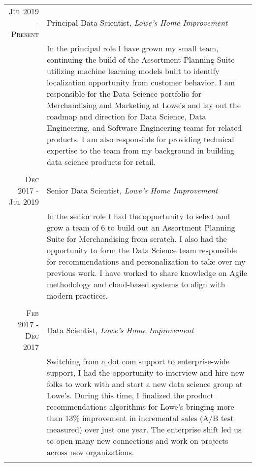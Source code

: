 \documentclass[a4paper,10pt]{article} %
\begin{document}
\begin{tabular}{r|p{11cm}}

\textsc{Jul 2019 - Present} & Principal Data Scientist, \emph{Lowe's Home Improvement} \\
& \footnotesize{In the principal role I have grown my small team, continuing the build of the Assortment Planning Suite utilizing machine learning models built to identify localization opportunity from customer behavior. I am responsible for the Data Science portfolio for Merchandising and Marketing at Lowe's and lay out the roadmap and direction for Data Science, Data Engineering, and Software Engineering teams for related products. I am also responsible for providing technical expertise to the team from my background in building data science products for retail.}\\

\multicolumn{2}{c}{} \\


\textsc{Dec 2017 - Jul 2019} & Senior Data Scientist, \emph{Lowe's Home Improvement} \\
& \footnotesize{In the senior role I had the opportunity to select and grow a team of 6 to build out an Assortment Planning Suite for Merchandising from scratch. I also had the opportunity to form the Data Science team responsible for recommendations and personalization to take over my previous work. I have worked to share knowledge on Agile methodology and cloud-based systems to align with modern practices.}\\

\multicolumn{2}{c}{} \\


\textsc{Feb 2017 - Dec 2017} & Data Scientist, \emph{Lowe's Home Improvement} \\
& \footnotesize{Switching from a dot com support to enterprise-wide support, I had the opportunity to interview and hire new folks to work with and start a new data science group at Lowe's. During this time, I finalized the product recommendations algorithms for Lowe's bringing more than 13\% improvement in incremental sales (A/B test measured) over just one year. The enterprise shift led us to open many new connections and work on projects across new organizations.}\\

\multicolumn{2}{c}{} \\


\end{tabular}
\end{document}
